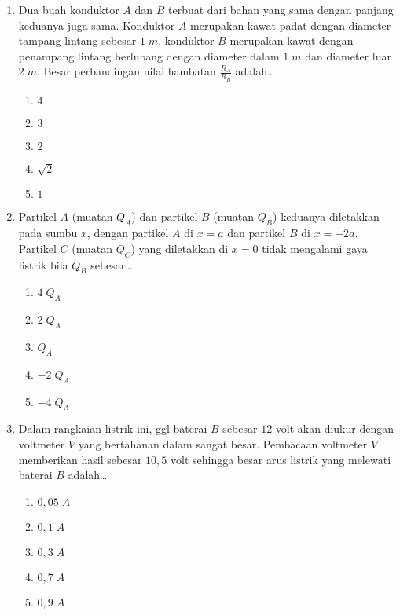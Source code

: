 \documentclass[A4,12PT, english, twocolumn]{journal}
\begin{document}
\begin{enumerate}
\item Dua buah konduktor $A$ dan $B$ terbuat dari bahan yang sama dengan panjang keduanya juga sama. Konduktor $A$ merupakan kawat padat dengan diameter tampang lintang sebesar $1 \; m$, konduktor $B$ merupakan kawat dengan penampang lintang berlubang dengan diameter dalam $1 \; m$ dan diameter luar $2 \; m$. Besar perbandingan nilai hambatan $\frac{R_A}{R_B}$ adalah\dots
    \begin{enumerate}
        \item $4$
        \item $3$
        \item $2$
        \item $\sqrt{2}$
        \item $1$
    \end{enumerate}
    
\item Partikel $A$ (muatan $Q_A$) dan partikel $B$ (muatan $Q_B$) keduanya diletakkan pada sumbu $x$, dengan partikel $A$ di $x=a$ dan partikel $B$ di $x=-2a$. Partikel $C$ (muatan $Q_C$) yang diletakkan di $x=0$ tidak mengalami gaya listrik bila $Q_B$ sebesar\dots
    \begin{enumerate}
        \item $4 \; Q_A$
        \item $2 \; Q_A$
        \item $Q_A$
        \item $-2 \; Q_A$
        \item $-4 \; Q_A$
    \end{enumerate}
    
\item Dalam rangkaian listrik ini, ggl baterai $B$ sebesar $12$ volt akan diukur dengan voltmeter $V$ yang bertahanan dalam sangat besar. Pembacaan voltmeter $V$ memberikan hasil sebesar $10,5$ volt sehingga besar arus listrik yang melewati baterai $B$ adalah\dots
\begin{center}
\end{center}
	\begin{enumerate}
		\item $0,05 \; A$
		\item $0,1 \; A$
		\item $0,3 \; A$
		\item $0,7 \; A$
		\item $0,9 \; A$
	\end{enumerate}
	

\end{enumerate}
\end{document}
